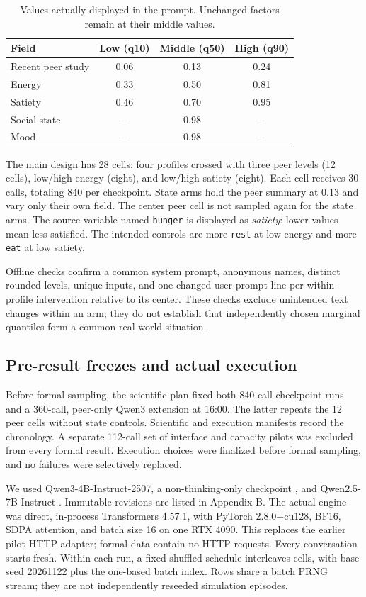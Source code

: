 \documentclass[conference]{IEEEtran}
\newcommand{\code}[1]{\texttt{#1}}
\begin{document}
\begin{table}[t]
\caption{Values actually displayed in the prompt. Unchanged factors remain at their middle values.}
\label{tab:levels}
\centering\small\setlength{\tabcolsep}{3.5pt}
\begin{tabular}{lccc}\toprule
Field & Low (q10) & Middle (q50) & High (q90)\\\midrule
Recent peer study & 0.06 & 0.13 & 0.24\\
Energy & 0.33 & 0.50 & 0.81\\
Satiety & 0.46 & 0.70 & 0.95\\
Social state & -- & 0.98 & --\\
Mood & -- & 0.98 & --\\\bottomrule
\end{tabular}
\end{table}

The main design has 28 cells: four profiles crossed with three peer levels (12 cells), low/high energy (eight), and low/high satiety (eight). Each cell receives 30 calls, totaling 840 per checkpoint. State arms hold the peer summary at 0.13 and vary only their own field. The center peer cell is not sampled again for the state arms. The source variable named \code{hunger} is displayed as \emph{satiety}: lower values mean less satisfied. The intended controls are more \code{rest} at low energy and more \code{eat} at low satiety.

Offline checks confirm a common system prompt, anonymous names, distinct rounded levels, unique inputs, and one changed user-prompt line per within-profile intervention relative to its center. These checks exclude unintended text changes within an arm; they do not establish that independently chosen marginal quantiles form a common real-world situation.

\subsection{Pre-result freezes and actual execution}
Before formal sampling, the scientific plan fixed both 840-call checkpoint runs and a 360-call, peer-only Qwen3 extension at 16:00. The latter repeats the 12 peer cells without state controls. Scientific and execution manifests record the chronology. A separate 112-call set of interface and capacity pilots was excluded from every formal result. Execution choices were finalized before formal sampling, and no failures were selectively replaced.

We used Qwen3-4B-Instruct-2507, a non-thinking-only checkpoint \cite{qwen3card}, and Qwen2.5-7B-Instruct \cite{qwen25card}. Immutable revisions are listed in Appendix B. The actual engine was direct, in-process Transformers 4.57.1, with PyTorch 2.8.0+cu128, BF16, SDPA attention, and batch size 16 on one RTX 4090. This replaces the earlier pilot HTTP adapter; formal data contain no HTTP requests. Every conversation starts fresh. Within each run, a fixed shuffled schedule interleaves cells, with base seed 20261122 plus the one-based batch index. Rows share a batch PRNG stream; they are not independently reseeded simulation episodes.
\end{document}
